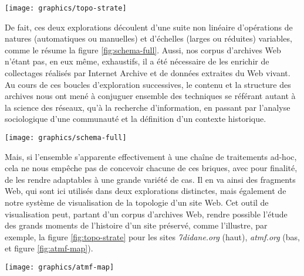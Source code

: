 \documentclass[symmetric,justified,marginals=raggedouter]{tufte-book}
\begin{document}
\begin{figure*}%
  \texttt{[image: graphics/topo-strate]}
  \caption{vue de l'évolution de la structure des sites \textit{7didane.org} (haut), \textit{atmf.org} (bas)}
  \label{fig:topo-strate}
\end{figure*}

\noindent De fait, ces deux explorations découlent d'une suite non linéaire d'opé\-rations de natures (automatiques ou manuelles) et d'échelles (lar\-ges ou réduites) variables, comme le résume la figure \ref{fig:schema-full}. Aussi, nos corpus d'archives Web n'étant pas, en eux même, exhaustifs, il a été nécessaire de les enrichir de collectages réalisés par Internet Archive et de données extraites du Web vivant. Au cours de ces boucles d'exploration successives, le contenu et la structure des archives nous ont mené à conjuguer ensemble des techniques se référant autant à la science des réseaux, qu'à la recherche d'information, en passant par l'analyse sociologique d'une communauté et la définition d'un contexte historique.

\begin{figure*}[hbtp]%
  \texttt{[image: graphics/schema-full]}
  \caption{Résumé des diverses opérations mises en place lors des explorations \ref{sec:6_blogs} et \ref{sec:6_printemps}, avec distinction entre approches automatique et manuelle}
  \label{fig:schema-full}
\end{figure*}

\noindent Mais, si l'ensemble s'apparente effectivement à une chaîne de traitements ad-hoc, cela ne nous empêche pas de concevoir chacune de ces briques, avec pour finalité, de les rendre adaptables à une grande variété de cas. Il en va ainsi des fragments Web, qui sont ici utilisés dans deux explorations distinctes, mais également de notre système de visualisation de la topologie d'un site Web. Cet outil de visualisation peut, partant d'un corpus d'archives Web, rendre possible l'étude des grands moments de l'histoire d'un site préservé, comme l'illustre, par exemple, la figure \ref{fig:topo-strate} pour les sites \textit{7didane.org} (haut), \textit{atmf.org} (bas, et figure \ref{fig:atmf-map}).

\begin{marginfigure}%
  \texttt{[image: graphics/atmf-map]}
  \vspace*{0.2cm}  
  \caption{\textit{atmf.org} (rouge) dans l'e-Diaspora marocaine}
  \label{fig:atmf-map}
\end{marginfigure} 
\end{document}
